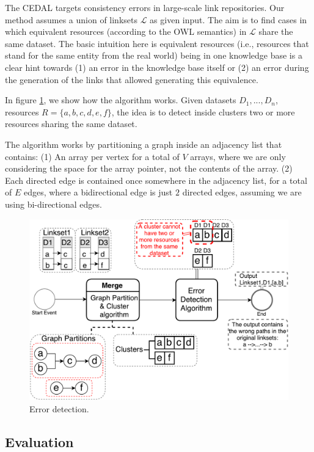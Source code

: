 The CEDAL targets consistency errors in large-scale link repositories. Our method assumes a union of linksets $\mathcal{L}$ as given input. The aim is to find cases in which equivalent resources (according to the OWL semantics) in $\mathcal{L}$ share the same dataset. The basic intuition here is equivalent resources (i.e., resources that stand for the same entity from the real world) being in one knowledge base is a clear hint towards (1) an error in the knowledge base itself or (2) an error during the generation of the links that allowed generating this equivalence.

In figure \ref{fig:ErrorDetection}, we show how the algorithm works. Given datasets $D_1,...,D_n$, resources $R=\{a,b,c,d,e,f\}$, the idea is to detect inside clusters two or more resources sharing the same dataset.

The algorithm works by partitioning a graph inside an adjacency list that contains: (1) An array per vertex for a total of $V$ arrays, where we are only considering the space for the array pointer, not the contents of the array. (2) Each directed edge is contained once somewhere in the adjacency list, for a total of $E$ edges, where a bidirectional edge is just $2$ directed edges, assuming we are using bi-directional edges. %


\begin{figure}[htb] 
	\centering
	\includegraphics[width=0.86\linewidth]{img/errorDetection8.pdf}
	\caption{Error detection.}
	\label{fig:ErrorDetection}
\end{figure} 


\subsection{Evaluation} \label{evaluation}

